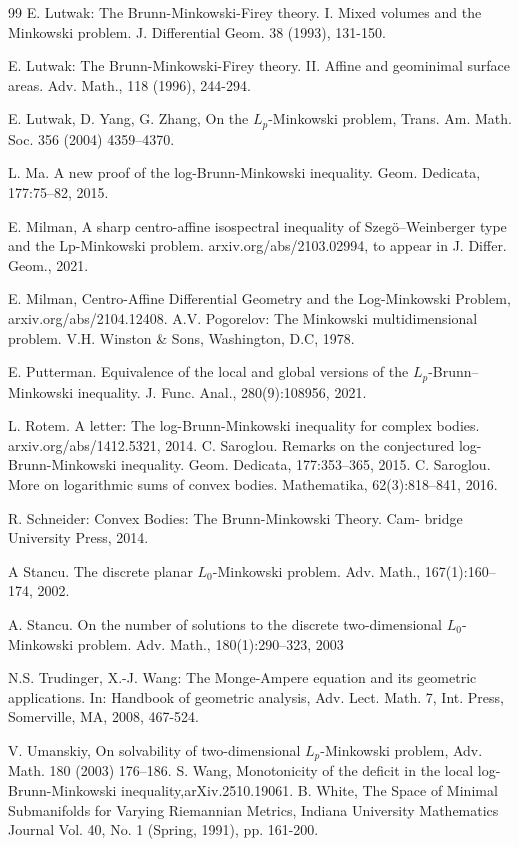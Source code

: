 \documentclass[reqno]{amsart}
\theoremstyle{remark}
\theoremstyle{plain}
\begin{document}
\begin{thebibliography}{99}
E. Lutwak: The Brunn-Minkowski-Firey theory. I. Mixed volumes and
the Minkowski problem. J. Differential Geom. 38 (1993), 131-150.

E. Lutwak: The Brunn-Minkowski-Firey theory. II. Affine and geominimal
surface areas. Adv. Math., 118 (1996), 244-294.

 E. Lutwak, D. Yang, G. Zhang, On the $L_p$-Minkowski problem, Trans. Am. Math. Soc. 356 (2004) 4359–4370.

 L. Ma. A new proof of the log-Brunn-Minkowski inequality. Geom. Dedicata, 177:75–82, 2015.

E. Milman, A sharp centro-affine isospectral inequality of Szeg\"o–Weinberger type and
the Lp-Minkowski problem. arxiv.org/abs/2103.02994, to appear in J. Differ. Geom., 2021. 

E. Milman, Centro-Affine Differential Geometry and the Log-Minkowski Problem, arxiv.org/abs/2104.12408.
A.V. Pogorelov: The Minkowski multidimensional problem. V.H. Winston \& Sons, Washington, D.C, 1978.

 E. Putterman. Equivalence of the local and global versions of the $L_p$-Brunn–
Minkowski inequality. J. Func. Anal., 280(9):108956, 2021.

 L. Rotem. A letter: The log-Brunn-Minkowski inequality for complex bodies.
arxiv.org/abs/1412.5321, 2014.
C. Saroglou. Remarks on the conjectured log-Brunn-Minkowski inequality. Geom.
Dedicata, 177:353–365, 2015.
 C. Saroglou. More on logarithmic sums of convex bodies. Mathematika, 62(3):818–841,
2016.

R. Schneider: Convex Bodies: The Brunn-Minkowski Theory. Cam-
bridge University Press, 2014.

A Stancu. The discrete planar $L_0$-Minkowski problem. Adv. Math., 167(1):160–174, 2002. 

 A. Stancu. On the number of solutions to the discrete two-dimensional $L_0$-Minkowski
problem. Adv. Math., 180(1):290–323, 2003

 N.S. Trudinger, X.-J. Wang: The Monge-Ampere equation and its
geometric applications. In: Handbook of geometric analysis, Adv. Lect.
Math. 7, Int. Press, Somerville, MA, 2008, 467-524.

V. Umanskiy, On solvability of two-dimensional $L_p$-Minkowski problem, Adv. Math. 180 (2003) 176–186.
S. Wang, Monotonicity of the deficit in the local log-Brunn-Minkowski inequality,arXiv.2510.19061.
B. White, The Space of Minimal Submanifolds for Varying Riemannian Metrics, Indiana University Mathematics Journal
Vol. 40, No. 1 (Spring, 1991), pp. 161-200. 


\end{thebibliography}
\end{document}
